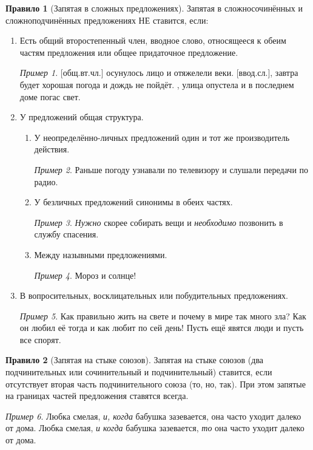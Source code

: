 \documentclass[12pt]{article}
\theoremstyle{definition}
\newtheorem{rrule}{Правило}[section]
\theoremstyle{remark}
\newtheorem*{example}{Пример}
\begin{document}
\begin{rrule}[Запятая в сложных предложениях]
    Запятая в сложносочинённых и сложноподчинённых предложениях НЕ ставится, если:
    \begin{enumerate}
        \item Есть общий второстепенный член, вводное слово, относящееся к обеим частям предложения или общее придаточное предложение.
        \begin{example}
            [общ.вт.чл.] осунулось лицо и отяжелели веки. [ввод.сл.], завтра будет хорошая погода и дождь не пойдёт. , улица опустела и в последнем доме погас свет.
        \end{example}
        \item У предложений общая структура.
        \begin{enumerate}
            \item У неопределённо-личных предложений один и тот же производитель действия.
            \begin{example}
                Раньше погоду узнавали по телевизору и слушали передачи по радио.
            \end{example}
            \item У безличных предложений синонимы в обеих частях.
            \begin{example}
                \textsl{Нужно} скорее собирать вещи и \textsl{необходимо} позвонить в службу спасения.
            \end{example}
            \item Между назывными предложениями.
            \begin{example}
                Мороз и солнце!
            \end{example}
        \end{enumerate}
        \item В вопросительных, восклицательных или побудительных предложениях.
        \begin{example}
            Как правильно жить на свете и почему в мире так много зла? Как он любил её тогда и как любит по сей день! Пусть ещё явятся люди и пусть все спорят.
        \end{example}
    \end{enumerate}
\end{rrule}

\begin{rrule}[Запятая на стыке союзов]
    Запятая на стыке союзов (два подчинительных или сочинительный и подчинительный) ставится, если отсутствует вторая часть подчинительного союза (то, но, так). При этом запятые на границах частей предложения ставятся всегда.
    \begin{example}
        Любка смелая, \textsl{и, когда} бабушка зазевается, она часто уходит далеко от дома. Любка смелая, \textsl{и когда} бабушка зазевается, \textsl{то} она часто уходит далеко от дома.
    \end{example}
\end{rrule}
\end{document}
